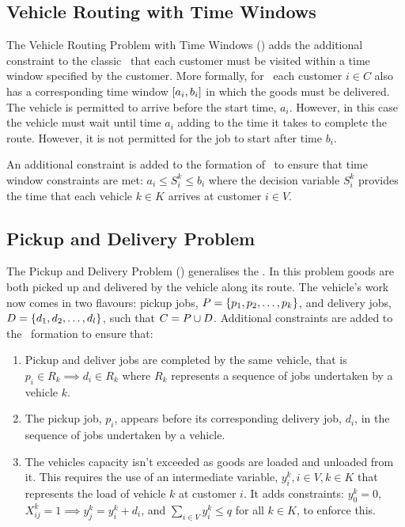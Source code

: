 \subsection{Vehicle Routing with Time Windows}

The Vehicle Routing Problem with Time Windows (\VRPTW) adds the additional constraint to the classic \VRP\ that each customer must be visited within a time window specified by the customer. More formally, for \VRPTW\ each customer $i \in C$ also has a corresponding time window $[a_i, b_i]$ in which the goods must be delivered. The vehicle is permitted to arrive before the start time, $a_i$. However, in this case the vehicle must wait until time $a_i$ adding to the time it takes to complete the route. However, it is not permitted for the job to start after time $b_i$.

An additional constraint is added to the formation of \CVRP\ to ensure that time window constraints are met: $a_i \leq S_i^k \leq b_i$ where the decision variable $S_i^k$ provides the time that each vehicle $k \in K$ arrives at customer $i \in V$.

\subsection{Pickup and Delivery Problem}

The Pickup and Delivery Problem (\PDP) generalises the \VRP. In this problem goods are both picked up and delivered by the vehicle along its route. The vehicle's work now comes in two flavours: pickup jobs, $P = \{p_1,p_2,\ldots,p_k\}$, and delivery jobs, $D = \{d_1,d_2,\ldots,d_l\}$, such that $C = P \cup D$. Additional constraints are added to the \CVRP\ formation to ensure that:

\begin{enumerate}
   \item Pickup and deliver jobs are completed by the same vehicle, that is $p_i \in R_k \implies d_i \in R_k$ where $R_k$ represents a sequence of jobs undertaken by a vehicle $k$.

   \item The pickup job, $p_i$, appears before its corresponding delivery job, $d_i$, in the sequence of jobs undertaken by a vehicle.

   \item The vehicles capacity isn't exceeded as goods are loaded and unloaded from it. This requires the use of an intermediate variable, $y^k_i, i \in V, k \in K$ that represents the load of vehicle $k$ at customer $i$. It adds constraints: $y^k_0 = 0$, $X_{ij}^k = 1 \implies y^k_j = y^k_i + d_i$, and $\sum_{i \in V} y^k_i \leq q$ for all $k \in K$, to enforce this.
   
\end{enumerate}

